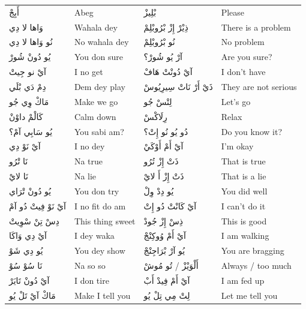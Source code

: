\documentclass[12pt]{article}
\newcommand{\AR}[1]{\foreignlanguage{arabic}{#1}}
\begin{document}
\begin{longtable}{p{3.2cm} p{3.2cm} p{3.2cm} p{3.2cm}}
\AR{أَبِجْ} & Abeg & \AR{بْلِيزْ} & Please \\
\AR{وَاها} \AR{لا} \AR{دِي} & Wahala dey & \AR{ذِيْرْ} \AR{إِزْ} \AR{بْرُوبْلِمْ} & There is a problem \\
\AR{نُو} \AR{وَاها} \AR{لا} \AR{دِي} & No wahala dey & \AR{نُو} \AR{بْرُوبْلِمْ} & No problem \\
\AR{يُو} \AR{دُونْ} \AR{شُورْ} & You don sure & \AR{آرْ} \AR{يُو} \AR{شُورْ؟} & Are you sure? \\
\AR{آيْ} \AR{نو} \AR{جِيتْ} & I no get & \AR{آيْ} \AR{دُونْتْ} \AR{هَافْ} & I don’t have \\
\AR{دِمْ} \AR{دَي} \AR{بْلَي} & Dem dey play & \AR{ذَيْ} \AR{أَرْ} \AR{نَاتْ} \AR{سِيرِيُوسْ} & They are not serious \\
\AR{مَاكْ} \AR{وِي} \AR{جُو} & Make we go & \AR{لِتْسْ} \AR{جُو} & Let’s go \\
\AR{كَالْمْ} \AR{داوْنْ} & Calm down & \AR{رِلَاكْسْ} & Relax \\
\AR{يُو} \AR{سَابِي} \AR{آمْ؟} & You sabi am? & \AR{دُو} \AR{يُو} \AR{نُو} \AR{إِتْ؟} & Do you know it? \\
\AR{آيْ} \AR{نَوْ} \AR{دِي} & I no dey & \AR{آيْ} \AR{أَمْ} \AR{أَوْكَيْ} & I’m okay \\
\AR{نَا} \AR{تْرُو} & Na true & \AR{ذَتْ} \AR{إِزْ} \AR{تُرُو} & That is true \\
\AR{نَا} \AR{لايْ} & Na lie & \AR{ذَتْ} \AR{إِزْ} \AR{أَ} \AR{لايْ} & That is a lie \\
\AR{يُو} \AR{دُونْ} \AR{تْرَاي} & You don try & \AR{يُو} \AR{دِدْ} \AR{وِلْ} & You did well \\
\AR{آيْ} \AR{نَوْ} \AR{فِيتْ} \AR{دُو} \AR{آمْ} & I no fit do am & \AR{آيْ} \AR{كَانْتْ} \AR{دُو} \AR{إِتْ} & I can’t do it \\
\AR{دِسْ} \AR{تِنْ} \AR{سْوِيتْ} & This thing sweet & \AR{ذِسْ} \AR{إِزْ} \AR{جُودْ} & This is good \\
\AR{آيْ} \AR{دِي} \AR{وَاكَا} & I dey waka & \AR{آيْ} \AR{أَمْ} \AR{وُوكِنْجْ} & I am walking \\
\AR{يُو} \AR{دِي} \AR{شَوْ} & You dey show & \AR{يُو} \AR{آرْ} \AR{بْرَاجِنْجْ} & You are bragging \\
\AR{نَا} \AR{سُوْ} \AR{سُوْ} & Na so so & \AR{أَلْوَيْزْ} / \AR{تُو} \AR{مُوشْ} & Always / too much \\
\AR{آيْ} \AR{دُونْ} \AR{تَايَرْ} & I don tire & \AR{آيْ} \AR{أَمْ} \AR{فِيدْ} \AR{أَبْ} & I am fed up \\
\AR{مَاكْ} \AR{آيْ} \AR{تَلْ} \AR{يُو} & Make I tell you & \AR{لِتْ} \AR{مِي} \AR{تِلْ} \AR{يُو} & Let me tell you \\


\end{longtable}
\end{document}
